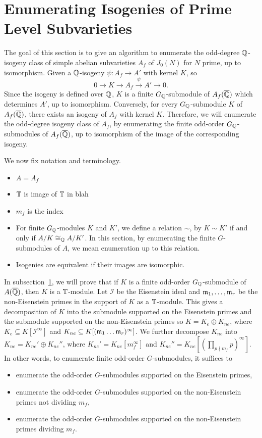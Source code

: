 \documentclass{article}
\begin{document}
    
\section{Enumerating Isogenies of Prime Level Subvarieties}

The goal of this section is to give an algorithm to enumerate the odd-degree
$\mathbb{Q}$-isogeny class of simple abelian subvarieties $A_f$ of $J_0(N)$ for $N$
prime, up to isomorphism. Given a $\mathbb{Q}$-isogeny $\psi:A_f\to A'$ with kernel $K$, so
\[
    0 \to K \to A_f \overset{\psi}{\to} A' \to 0.
\]
Since the isogeny is defined over $\mathbb{Q}$, $K$ is a finite $G_{\mathbb{Q}}$-submodule of
$A_f(\overline{\mathbb{Q}})$ which determines $A'$, up to isomorphism. Conversely, for every
$G_{\mathbb{Q}}$-submodule $K$ of $A_f(\overline{\mathbb{Q}})$, there exists an isogeny of $A_f$ with
kernel $K$. Therefore, we will enumerate the odd-degree isogeny class of $A_f$,
by enumerating the finite odd-order $G_{\mathbb{Q}}$-submodules of $A_f(\overline{\mathbb{Q}})$, up to
isomorphism of the image of the corresponding isogeny. 

We now fix notation and terminology. 
\begin{itemize}
    \item
        $A=A_f$
    \item
        $\mathbb{T}$ is image of $\mathbb{T}$ in blah 
    \item
        $m_f$ is the index
    \item
        For finite $G_{\mathbb{Q}}$-modules $K$ and $K'$, we define a relation $\sim$,
        by $K\sim K'$ if and only if $A/K\cong_{\mathbb{Q}} A/K'$. In this section, by
        enumerating the finite $G$-submodules of $A$, we mean enumeration up to
        this relation. 
    \item
        Isogenies are equivalent if their images are isomorphic.
\end{itemize}
    
In subsection~\ref{}, we will prove that if $K$ is a finite odd-order
$G_{\mathbb{Q}}$-submodule of $A(\overline{\mathbb{Q}})$, then $K$ is a $\mathbb{T}$-module. Let
$\mathcal{I}$ be the Eisenstein ideal and $\mathfrak{m}_1,\ldots,\mathfrak{m}_r$ be the
non-Eisenstein primes in the support of $K$ as a $\mathbb{T}$-module. This gives a
decomposition of $K$ into the submodule supported on the Eisenstein primes and
the submodule supported on the non-Eisenstein primes so $K=K_e \oplus K_{ne}$,
where $K_e\subseteq K[\mathcal{I}^\infty]$ and $K_{ne}\subseteq
K[(\mathfrak{m}_1\ldots\mathfrak{m}_r)^\infty]$. We further decompose $K_{ne}$ into $K_{ne}=K_{ne}'
\oplus K_{ne} ''$, where $K_{ne}'=K_{ne}[m_f ^\infty]$ and $K_{ne}'' =
K_{ne}[(\prod_{p\nmid m_f} p)^\infty]$. In other words, to enumerate finite
odd-order $G$-submodules, it suffices to 
\begin{itemize}
    \item 
        enumerate the odd-order $G$-submodules supported on the Eisenstein
        primes,
    \item
        enumerate the odd-order $G$-submodules supported on the non-Eisenstein
        primes not dividing $m_f$,
    \item
        enumerate the odd-order $G$-submodules supported on the non-Eisenstein
        primes dividing $m_f$.
\end{itemize}
\end{document}
